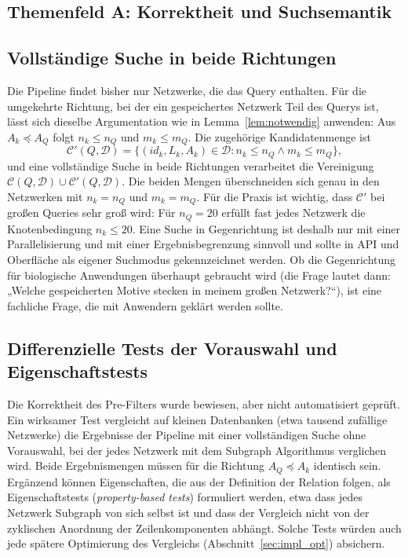 \documentclass[a4paper,12pt, twoside]{report}
\theoremstyle{definition}
\begin{document}
\subsection*{Themenfeld A: Korrektheit und Suchsemantik}

\subsection{Vollständige Suche in beide Richtungen}
\label{sec:beide_richtungen}

Die Pipeline findet bisher nur Netzwerke, die das Query enthalten. Für die umgekehrte Richtung, bei der ein gespeichertes Netzwerk Teil des Querys ist, lässt sich dieselbe Argumentation wie in Lemma~\ref{lem:notwendig} anwenden: Aus $A_k \preceq A_Q$ folgt $n_k \le n_Q$ und $m_k \le m_Q$. Die zugehörige Kandidatenmenge ist
\[
\mathcal{C}'(Q,\mathcal{D}) = \{(id_k,L_k,A_k)\in\mathcal{D} : n_k \le n_Q \wedge m_k \le m_Q\},
\]
und eine vollständige Suche in beide Richtungen verarbeitet die Vereinigung $\mathcal{C}(Q,\mathcal{D})\cup\mathcal{C}'(Q,\mathcal{D})$. Die beiden Mengen überschneiden sich genau in den Netzwerken mit $n_k=n_Q$ und $m_k=m_Q$. Für die Praxis ist wichtig, dass $\mathcal{C}'$ bei großen Queries sehr groß wird: Für $n_Q=20$ erfüllt fast jedes Netzwerk die Knotenbedingung $n_k\le 20$. Eine Suche in Gegenrichtung ist deshalb nur mit einer Parallelisierung und mit einer Ergebnisbegrenzung sinnvoll und sollte in API und Oberfläche als eigener Suchmodus gekennzeichnet werden. Ob die Gegenrichtung für biologische Anwendungen überhaupt gebraucht wird (die Frage lautet dann: „Welche gespeicherten Motive stecken in meinem großen Netzwerk?“), ist eine fachliche Frage, die mit Anwendern geklärt werden sollte.

\subsection{Differenzielle Tests der Vorauswahl und Eigenschaftstests}

Die Korrektheit des Pre-Filters wurde bewiesen, aber nicht automatisiert geprüft. Ein wirksamer Test vergleicht auf kleinen Datenbanken (etwa tausend zufällige Netzwerke) die Ergebnisse der Pipeline mit einer vollständigen Suche ohne Vorauswahl, bei der jedes Netzwerk mit dem Subgraph Algorithmus verglichen wird. Beide Ergebnismengen müssen für die Richtung $A_Q\preceq A_k$ identisch sein. Ergänzend können Eigenschaften, die aus der Definition der Relation folgen, als Eigenschaftstests (\emph{property-based tests}) formuliert werden, etwa dass jedes Netzwerk Subgraph von sich selbst ist und dass der Vergleich nicht von der zyklischen Anordnung der Zeilenkomponenten abhängt. Solche Tests würden auch jede spätere Optimierung des Vergleichs (Abschnitt~\ref{sec:impl_opt}) absichern.
\end{document}
